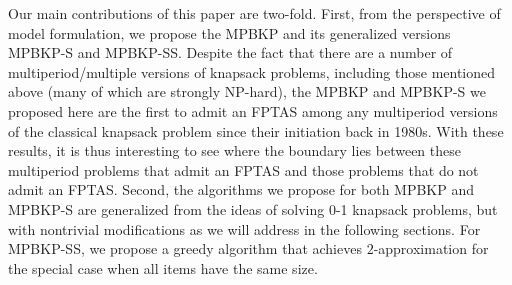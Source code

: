 Our main contributions of this paper are two-fold. First, from the perspective of model formulation, we propose the MPBKP and its generalized versions MPBKP-S and MPBKP-SS. {  Despite the fact that there are a number of multiperiod/multiple versions of knapsack problems, including those mentioned above (many of which are strongly NP-hard), the MPBKP and MPBKP-S we proposed here are the first to admit an FPTAS among any multiperiod versions of the classical knapsack problem since their initiation back in 1980s.} With these results, it is thus interesting to see where the boundary lies between these multiperiod problems that admit an FPTAS and those problems that do not admit an FPTAS. { Second, the algorithms we propose for both MPBKP and MPBKP-S are generalized from the ideas of solving 0-1 knapsack problems, but with nontrivial modifications as we will address in the following sections. For MPBKP-SS, we propose a greedy algorithm that achieves $2$-approximation for the special case when all items have the same size.}
\begin{comment}
For MPBKP, we adopt the ``functional'' approach as used in~\cite{chan:OASIcs:2018:8299,jin:LIPIcs:2019:10652}. Roughly speaking, for each period $t$, we approximate the function that gives the maximum reward on every capacity, by selecting items with deadline $t$. Then, we conduct the $(\max,+)$-convolution on the truncated version of these functions, where the resulting function values are then rounded down to some powers of $(1+\epsilon)$. After $T$ periods, we obtain an approximation factor of $(1+\epsilon)^T$ and we adjust $\epsilon$ correspondingly to achieve $(1+\epsilon)$ approximation in $\tilde{\Ocal}\left(n+\frac{T^{3.25}}{\epsilon^{2.25}}\right)$. In Appendix, we also provide another FPTAS with runtime $\tilde{\Ocal}\left(n+\frac{T^2}{\epsilon^3}\right)$. For MPBKP-S, however,  this approach would not work for some technical reasons (details provided in section~\ref{sec:approx2}). Our algorithm for MPBKP-S is motivated by the earlier technique that originated from~\cite{ibarra1975fast}, but with significant modifications. We partition the set of items into ``large'' items and ``small'' items according to a suitably chosen criterion, and during each time period, we use dynamic programming for picking large items and a greedy heuristic for picking small items. The partial solutions obtained at the end of each time $t$ are cleverly carried to the next time $t+1$ for selecting items with deadline $t+1$. We prove that the discretization involved in dynamic programming for large items results in a $\frac{1}{2}\epsilon$ approximation error, and the greedy heuristic for small items results in a $\frac{1}{2T}\epsilon$ approximation error per time period, for a total of $\epsilon$ approximation error overall. Our results show that a~$(1+\epsilon)$ approximation factor can be achieved in $\Ocal\left(\frac{n\log n}{\epsilon}\cdot\min\left\{\frac{T}{\epsilon},n\right\}\right)$.
\end{comment}

